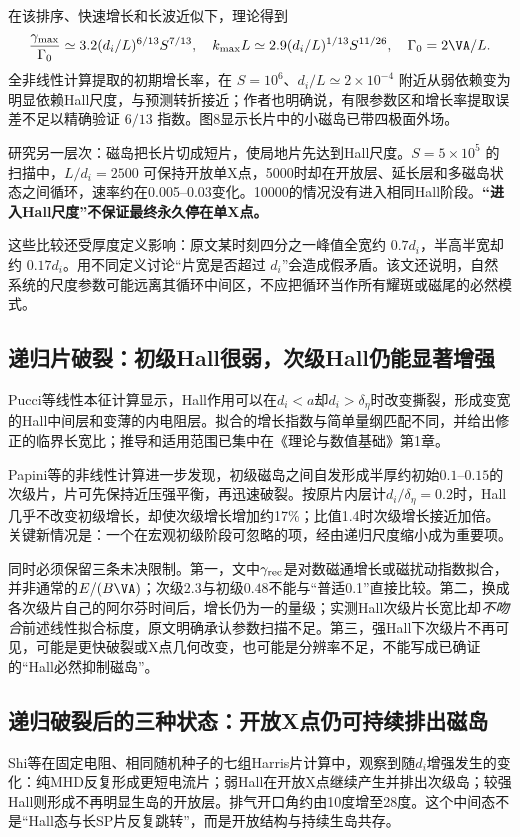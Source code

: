 \documentclass[UTF8,a4paper,11pt,openany,fontset=fandol]{ctexbook}
\begin{document}
在该排序、快速增长和长波近似下，理论得到
\begin{equation}
{\gamma_{\max}\over\Gamma_0}\simeq3.2(d_i/L)^{6/13}S^{7/13},\quad
k_{\max}L\simeq2.9(d_i/L)^{1/13}S^{11/26},\quad\Gamma_0=2\VA/L.
\end{equation}
全非线性计算提取的初期增长率，在 $S=10^6$、$d_i/L\simeq2\times10^{-4}$ 附近从弱依赖变为明显依赖Hall尺度，与预测转折接近；作者也明确说，有限参数区和增长率提取误差不足以精确验证 $6/13$ 指数。图8显示长片中的小磁岛已带四极面外场。

\citet{Huang2011}研究另一层次：磁岛把长片切成短片，使局地片先达到Hall尺度。$S=5\times10^5$ 的扫描中，$L/d_i=2500$ 可保持开放单X点，5000时却在开放层、延长层和多磁岛状态之间循环，速率约在0.005--0.03变化。10000的情况没有进入相同Hall阶段。\textbf{“进入Hall尺度”不保证最终永久停在单X点。}

这些比较还受厚度定义影响：原文某时刻四分之一峰值全宽约 $0.7d_i$，半高半宽却约 $0.17d_i$。用不同定义讨论“片宽是否超过 $d_i$”会造成假矛盾。该文还说明，自然系统的尺度参数可能远离其循环中间区，不应把循环当作所有耀斑或磁尾的必然模式。

\subsection{递归片破裂：初级Hall很弱，次级Hall仍能显著增强}
Pucci等线性本征计算显示，Hall作用可以在$d_i<a$却$d_i>\delta_\eta$时改变撕裂，形成变宽的Hall中间层和变薄的内电阻层。拟合的增长指数与简单量纲匹配不同，并给出修正的临界长宽比；推导和适用范围已集中在《理论与数值基础》第1章。\citep{L236}

Papini等的非线性计算进一步发现，初级磁岛之间自发形成半厚约初始$0.1$--$0.15$的次级片，片可先保持近压强平衡，再迅速破裂。按原片内层计$d_i/\delta_\eta=0.2$时，Hall几乎不改变初级增长，却使次级增长增加约17\%；比值1.4时次级增长接近加倍。关键新情况是：一个在宏观初级阶段可忽略的项，经由递归尺度缩小成为重要项。\citep{L262}

同时必须保留三条未决限制。第一，文中$\gamma_{\rm rec}$是对数磁通增长或磁扰动指数拟合，并非通常的$E/(B\VA)$；次级$2.3$与初级$0.48$不能与“普适0.1”直接比较。第二，换成各次级片自己的阿尔芬时间后，增长仍为一的量级；实测Hall次级片长宽比却\emph{不吻合}前述线性拟合标度，原文明确承认参数扫描不足。第三，强Hall下次级片不再可见，可能是更快破裂或X点几何改变，也可能是分辨率不足，不能写成已确证的“Hall必然抑制磁岛”。

\subsection{递归破裂后的三种状态：开放X点仍可持续排出磁岛}
Shi等在固定电阻、相同随机种子的七组Harris片计算中，观察到随$d_i$增强发生的变化：纯MHD反复形成更短电流片；弱Hall在开放X点继续产生并排出次级岛；较强Hall则形成不再明显生岛的开放层。排气开口角约由10度增至28度。这个中间态不是“Hall态与长SP片反复跳转”，而是开放结构与持续生岛共存。\citep{L263}
\end{document}
